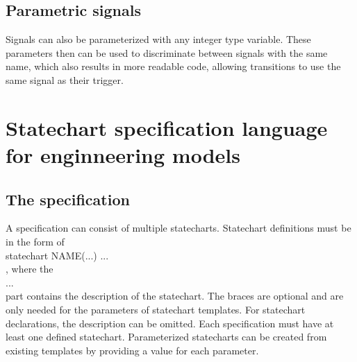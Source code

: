   \subsection{Parametric signals}
Signals can also be parameterized with any integer type variable. These parameters then can be used to discriminate between signals with the same name, which also results in more readable code, allowing transitions to use the same signal as their trigger.
\section{Statechart specification language for enginneering models}
  \subsection{The specification}
A specification can consist of multiple statecharts. Statechart definitions must be in the form of \\statechart NAME(...) { ... }\\, where the \\{ ... }\\ part contains the description of the statechart. The braces are optional and are only needed for the parameters of statechart templates. For statechart declarations, the description can be omitted. Each specification must have at least one defined statechart. Parameterized statecharts can be created from existing templates by providing a value for each parameter.

